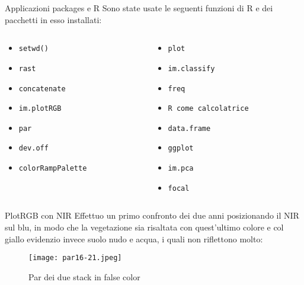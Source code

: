 \documentclass{beamer} %
\begin{document}
        \begin{frame}{Applicazioni packages e R}
        Sono state usate le seguenti funzioni di R e dei pacchetti in esso installati:
        \bigskip
\begin{columns}
\begin{column}{0.5\textwidth}
\begin{itemize}
    \item    \texttt{setwd()} 
    \item    \texttt{rast} 
    \item    \texttt{concatenate} 
    \item    \texttt{im.plotRGB}
    \item    \texttt{par}
    \item    \texttt{dev.off}
    \item    \texttt{colorRampPalette}
\end{itemize}
\end{column}
\begin{column}{0.5\textwidth}  
 \begin{itemize}
    \item    \texttt{plot}
    \item    \texttt{im.classify}
    \item    \texttt{freq}
    \item    \texttt{R come calcolatrice}
    \item    \texttt{data.frame}
    \item    \texttt{ggplot}
    \item    \texttt{im.pca}
    \item    \texttt{focal}
    \end{itemize}
\end{column}
\end{columns}
\end{frame}
        
        \begin{frame}{PlotRGB con NIR}
Effettuo un primo confronto dei due anni posizionando il NIR sul blu, in modo che la vegetazione sia risaltata con quest'ultimo colore e col giallo evidenzio invece suolo nudo e acqua, i quali non riflettono molto:
\begin{figure}
        \centering
        \texttt{[image: par16-21.jpeg]}
        \caption{Par dei due stack in false color}
    \end{figure}

\end{frame}
        
\end{document}
